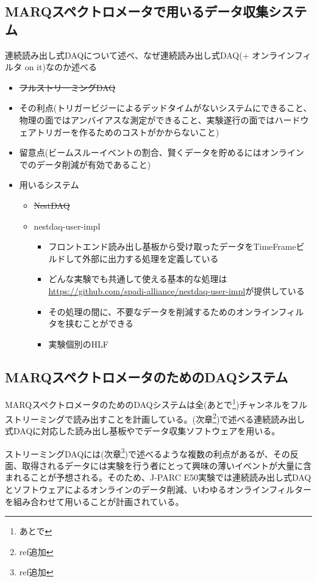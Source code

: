 \documentclass[../main.tex]{subfiles}
\begin{document}
\subsection{MARQスペクトロメータで用いるデータ収集システム}
連続読み出し式DAQについて述べ、なぜ連続読み出し式DAQ(+ オンラインフィルタ on it)なのか述べる
\begin{tcolorbox}[
  title=執筆メモ,
  colback=yellow!8,
  colframe=black!30,
  breakable
]
\begin{itemize}
  \item \sout{フルストリーミングDAQ}
  \item その利点(トリガービジーによるデッドタイムがないシステムにできること、物理の面ではアンバイアスな測定ができること、実験遂行の面ではハードウェアトリガーを作るためのコストがかからないこと)
  \item 留意点(ビームスルーイベントの割合、賢くデータを貯めるにはオンラインでのデータ削減が有効であること)
  \item 用いるシステム
  \begin{itemize}
    \item \sout{NestDAQ}
    \item nestdaq-user-impl
    \begin{itemize}
      \item フロントエンド読み出し基板から受け取ったデータをTimeFrameビルドして外部に出力する処理を定義している
      \item どんな実験でも共通して使える基本的な処理は\url{https://github.com/spadi-alliance/nestdaq-user-impl}が提供している
      \item その処理の間に、不要なデータを削減するためのオンラインフィルタを挟むことができる
      \item 実験個別のHLF
    \end{itemize}
  \end{itemize}
\end{itemize}
\end{tcolorbox}

\subsection{MARQスペクトロメータのためのDAQシステム}
MARQスペクトロメータのためのDAQシステムは全(あとで\footnote{あとで})チャンネルをフルストリーミングで読み出すことを計画している。(次章\footnote{ref追加})で述べる連続読み出し式DAQに対応した読み出し基板やでデータ収集ソフトウェアを用いる。

ストリーミングDAQには(次章\footnote{ref追加})で述べるような複数の利点があるが、その反面、取得されるデータには実験を行う者にとって興味の薄いイベントが大量に含まれることが予想される。そのため、J-PARC E50実験では連続読み出し式DAQとソフトウェアによるオンラインのデータ削減、いわゆるオンラインフィルターを組み合わせて用いることが計画されている。
\end{document}
